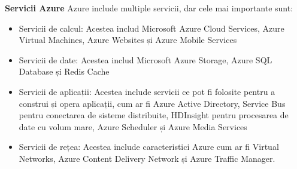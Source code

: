 \textbf{Servicii Azure}
Azure include multiple servicii, dar cele mai importante sunt:
\begin{itemize}
	\item Servicii de calcul: Acestea includ Microsoft Azure Cloud Services, Azure Virtual Machines, Azure Websites și Azure Mobile Services
	\item Servicii de date: Acestea includ Microsoft Azure Storage, Azure SQL Database și Redis Cache
	\item Servicii de aplicații: Acestea include servicii ce pot fi folosite pentru a construi și opera aplicații, cum ar fi Azure Active Directory, Service Bus pentru conectarea de sisteme distribuite, HDInsight pentru procesarea de date cu volum mare, Azure Scheduler și Azure Media Services
	\item Servicii de rețea: Acestea include caracteristici Azure cum ar fi Virtual Networks, Azure Content Delivery Network și Azure Traffic Manager.
\end{itemize}





